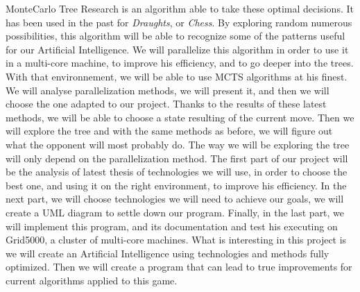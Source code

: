 MonteCarlo Tree Research is an algorithm able to take these optimal decisions. It has been used in the past for \textit{Draughts}, or \textit{Chess}. By exploring random numerous possibilities, this algorithm will be able to recognize some of the patterns useful for our Artificial Intelligence.
We will parallelize this algorithm in order to use it in a multi-core machine, to improve his efficiency, and to go deeper into the trees.
With that environnement, we will be able to use MCTS algorithms at his finest.
\newline
\newline
We will analyse parallelization methods, we will present it, and then we will choose the one adapted to our project.
Thanks to the results of these latest methods, we will be able to choose a state resulting of the current move. Then we will explore the tree and with the same methods as before, we will figure out what the opponent will most probably do. The way we will be exploring the tree will only depend on the parallelization method.
The first part of our project will be the analysis of latest thesis of technologies we will use, in order to choose the best one, and using it on the right environment, to improve his  efficiency.
In the next part, we will choose technologies we will need to achieve our goals, we will create a UML diagram to settle down our program.
\newline
\newline
Finally, in the last part, we will implement this program, and its documentation and test his executing on Grid5000, a cluster of multi-core machines.
What is interesting in this project is we will create an Artificial Intelligence using technologies and methods fully optimized. Then we will create a program that can lead to true improvements for current algorithms applied to this game.


